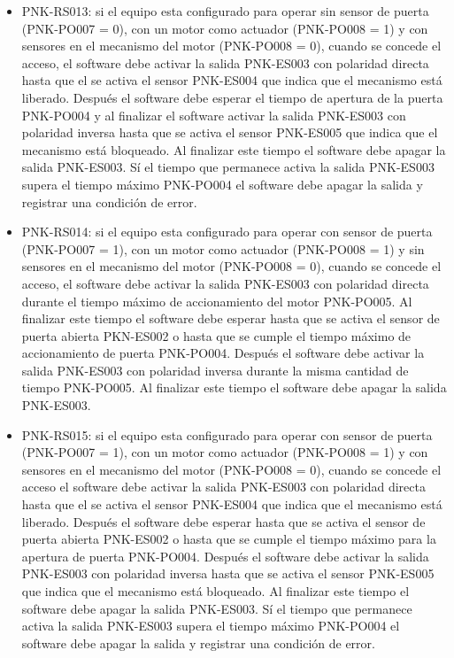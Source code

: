 \begin{itemize}
\begin{itemize}
		\item PNK-RS013: si el equipo esta configurado para operar sin sensor de puerta (PNK-PO007 = 0), con un motor como actuador (PNK-PO008 = 1) y con sensores en el mecanismo del motor (PNK-PO008 = 0), cuando se concede el acceso, el software debe activar la salida PNK-ES003 con polaridad directa hasta que el se activa el sensor PNK-ES004 que indica que el mecanismo está liberado. Después el software debe esperar el tiempo de apertura de la puerta PNK-PO004 y al finalizar el software activar la salida PNK-ES003 con polaridad inversa hasta que se activa el sensor PNK-ES005 que indica que el mecanismo está bloqueado. Al finalizar este tiempo el software debe apagar la salida PNK-ES003. Sí el tiempo que permanece activa la salida PNK-ES003 supera el tiempo máximo PNK-PO004 el software debe apagar la salida y registrar una condición de error.
		
		\item PNK-RS014: si el equipo esta configurado para operar con sensor de puerta (PNK-PO007 = 1), con un motor como actuador (PNK-PO008 = 1) y sin sensores en el mecanismo del motor (PNK-PO008 = 0), cuando se concede el acceso, el software debe activar la salida PNK-ES003 con polaridad directa durante el tiempo máximo de accionamiento del motor PNK-PO005. Al finalizar este tiempo el software debe esperar hasta que se activa el sensor de puerta abierta PKN-ES002 o hasta que se cumple el tiempo máximo de accionamiento de puerta PNK-PO004. Después el software debe activar la salida PNK-ES003 con polaridad inversa durante la misma cantidad de tiempo PNK-PO005. Al finalizar este tiempo el software debe apagar la salida PNK-ES003.
		
		\item PNK-RS015: si el equipo esta configurado para operar con sensor de puerta (PNK-PO007 = 1), con un motor como actuador (PNK-PO008 = 1) y con sensores en el mecanismo del motor (PNK-PO008 = 0), cuando se concede el acceso el software debe activar la salida PNK-ES003 con polaridad directa hasta que el se activa el sensor PNK-ES004 que indica que el mecanismo está liberado. Después el software debe esperar hasta que se activa el sensor de puerta abierta PNK-ES002 o hasta que se cumple el tiempo máximo para la apertura de puerta PNK-PO004. Después el software debe activar la salida PNK-ES003 con polaridad inversa hasta que se activa el sensor PNK-ES005 que indica que el mecanismo está bloqueado. Al finalizar este tiempo el software debe apagar la salida PNK-ES003. Sí el tiempo que permanece activa la salida PNK-ES003 supera el tiempo máximo PNK-PO004 el software debe apagar la salida y registrar una condición de error.
	\end{itemize}			


\end{itemize}
